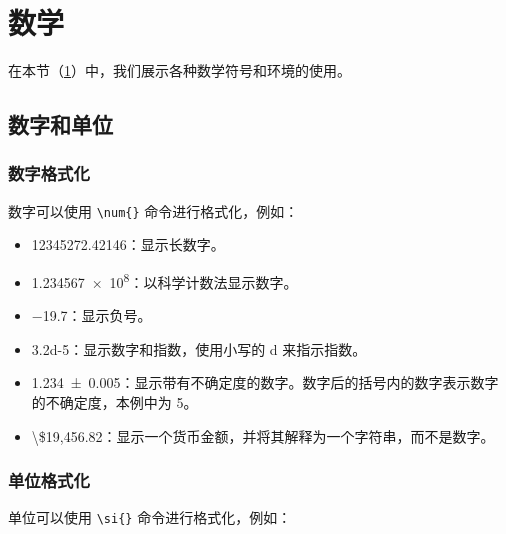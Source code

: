 \section{数学}\label{sec:math}

在本节（\cref{sec:math}）中，我们展示各种数学符号和环境的使用。

\subsection{数字和单位}

\subsubsection*{数字格式化}

数字可以使用 \verb|\num{}| 命令进行格式化，例如：

\begin{itemize}
\item \num{12345272.42146}：显示长数字。
\item \num{1.234567e8}：以科学计数法显示数字。
\item \num{-19.7}：显示负号。
\item \num{3.2d-5}：显示数字和指数，使用小写的 d 来指示指数。
\item \num{1.234(5)}：显示带有不确定度的数字。数字后的括号内的数字表示数字的不确定度，本例中为 5。
\item \num[parse-numbers=false]{\$19,456.82}：显示一个货币金额，并将其解释为一个字符串，而不是数字。
\end{itemize}

\subsubsection*{单位格式化}

单位可以使用 \verb|\si{}| 命令进行格式化，例如：

